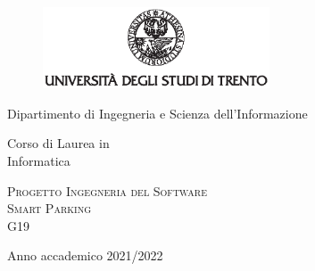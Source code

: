 \pagestyle{plain}
\thispagestyle{empty}

\graphicspath{{assets/figures/}}

\begin{center}
	\begin{figure}[h!]
		\centerline{\includegraphics[width=0.6\textwidth]{Img/logo_unitn_black_center.eps}}
	\end{figure}

	\vspace{2 cm}

	\LARGE{Dipartimento di Ingegneria e Scienza dell’Informazione}

	\vspace{1 cm}

	\Large{
		Corso di Laurea in\\
		Informatica
	}

	\vspace{2 cm}
	\Large\textsc{Progetto Ingegneria del Software\\}
	\vspace{1 cm}
	\Huge\textsc{Smart Parking\\}
	\vspace{1cm}
	\Large{G19}

	\vspace{4cm}

	\Large{Anno accademico 2021/2022}
\end{center}